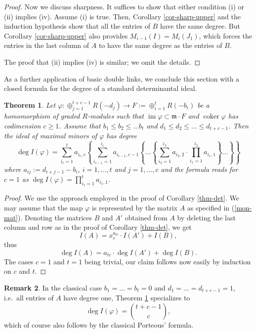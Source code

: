 \documentclass[12pt,twoside]{amsart}
\numberwithin{equation}{section}
\newcommand{\ffi}{\varphi}
\newcommand{\fm}{{\mathfrak m}}
\newcommand{\im}{\operatorname{im}}
\newcommand{\coker}{\operatorname{coker}}
\newtheorem{theorem}{Theorem}[section]
\theoremstyle{definition}
\newtheorem{remark}[theorem]{Remark}
\begin{document}
\begin{proof}
Now we discuss sharpness. It suffices to show that either condition (i) or (ii) implies
(iv). Assume (i) is true. Then, Corollary \ref{cor-sharp-upper} and the induction
hypothesis show that all the entries of $B$ have the same degree. But Corollary
\ref{cor-sharp-upper} also provides $M_{i-1} (I) = M_i (J_1)$, which forces the entries
in the last column of $A$ to have the same degree as the entries of $B$.

The proof that (ii) implies (iv) is similar; we omit the details.
\end{proof}

As a further application of basic double links, we conclude this section with a closed
formula for the degree of a standard determinantal ideal.


\begin{theorem} \label{thm-degree-form}
Let $\ffi: \oplus_{j = 1}^{t+c-1} R(-d_j) \to F := \oplus_{i = 1}^t R(-b_i)$ be a
homomorphism of graded $R$-modules such that $\im \ffi \subset \fm \cdot F$ and $\coker
\ffi$ has codimension $c \geq 1$. Assume that $b_1 \leq b_2 \leq \ldots b_t$ and $d_1
\leq d_2 \leq \ldots \leq d_{t+c-1}$. Then the ideal of maximal minors of $\ffi$ has
degree
$$
\deg I(\ffi) = \sum_{i_c = 1}^t a_{i_c, c} \left \{ \sum_{i_{c-1} = 1}^{i_c} a_{i_{c-1},
c-1} \left \{ \ldots \left \{ \sum_{i_2 = 1}^{i_3} a_{i_2, 2} \cdot \prod_{i_1 = 1}^{i_2}
a_{i_1, 1} \right \} \ldots \right \} \right \}
$$
where $a_{i j} := d_{i+j-1} - b_i$, $i = 1,\ldots,t$ and $j= 1,\ldots,c$ and the formula
reads for $c=1$ as $\deg I(\ffi) = \prod_{i_1 = 1}^{t} a_{i_1, 1}$.
\end{theorem}

\begin{proof}
We use the approach employed in the proof of Corollary \ref{thm-det}. We may assume that
the map $\ffi$ is represented by the matrix $A$ as specified in (\ref{mon-mat}). Denoting
the matrices $B$ and $A'$ obtained from $A$ by deleting the last column and row as in the
proof of Corollary \ref{thm-det}, we get
$$
I(A) = x_c^{a_{t c}} \cdot I(A') + I(B),
$$
thus
$$
\deg I(A) = a_{t c} \cdot  \deg I(A') + \deg I(B).
$$
The cases $c=1$ and $t=1$ being trivial, our claim follows now easily by induction on $c$
and $t$.
\end{proof}

\begin{remark}
In the classical case $b_1 = \ldots = b_t = 0$ and $d_1 = \ldots = d_{t+c-1} = 1$, i.e.\
all entries of $A$ have degree one,  Theorem \ref{thm-degree-form} specializes to
$$
\deg I(\ffi) = \binom{t+c-1}{c},
$$
which of course also follows by  the classical Porteous' formula.
\end{remark}
\end{document}
